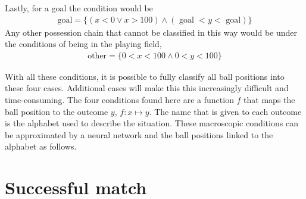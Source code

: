\documentclass[10pt, a4paper]{UUThesisTemplate}
\begin{document}
Lastly, for a goal the condition would be
\begin{align}
\text{goal} = \{(x < 0 \vee x > 100) \wedge (\text{ goal } < y < \text{ goal})\}
\end{align}
Any other possession chain that cannot be classified in this way would be under the conditions of being in the playing field,
\begin{align}
\text{other} = \{0 < x < 100 \wedge 0 < y < 100\}
\end{align}

With all these conditions, it is possible to fully classify all ball positions into these four cases. Additional cases will make this this increasingly difficult and time-consuming. The four conditions found here are a function $f$ that maps the ball position to the outcome $y$, $f: x\mapsto y$. The name that is given to each outcome is the alphabet used to describe the situation. These macroscopic conditions can be approximated by a neural network and the ball positions linked to the alphabet as follows.

\section{Successful match}
\end{document}
